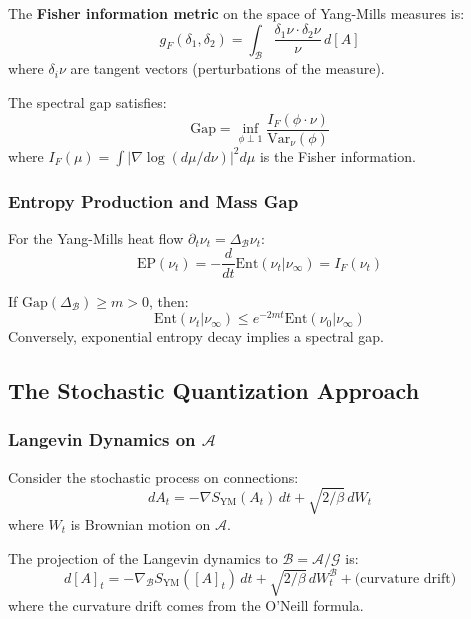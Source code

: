\begin{definition}
The \textbf{Fisher information metric} on the space of Yang-Mills measures is:
\[
g_F(\delta_1, \delta_2) = \int_{\mathcal{B}} \frac{\delta_1 \nu \cdot \delta_2 \nu}{\nu} \, d[A]
\]
where $\delta_i \nu$ are tangent vectors (perturbations of the measure).
\end{definition}

\begin{theorem}
The spectral gap satisfies:
\[
\text{Gap} = \inf_{\phi \perp 1} \frac{I_F(\phi \cdot \nu)}{\text{Var}_\nu(\phi)}
\]
where $I_F(\mu) = \int |\nabla \log(d\mu/d\nu)|^2 d\mu$ is the Fisher information.
\end{theorem}

\subsubsection{Entropy Production and Mass Gap}

\begin{definition}
For the Yang-Mills heat flow $\partial_t \nu_t = \Delta_{\mathcal{B}} \nu_t$:
\[
\text{EP}(\nu_t) = -\frac{d}{dt} \text{Ent}(\nu_t | \nu_\infty) = I_F(\nu_t)
\]
\end{definition}

\begin{theorem}\label{thm:entropy-decay}
If $\text{Gap}(\Delta_{\mathcal{B}}) \geq m > 0$, then:
\[
\text{Ent}(\nu_t | \nu_\infty) \leq e^{-2mt} \text{Ent}(\nu_0 | \nu_\infty)
\]
Conversely, exponential entropy decay implies a spectral gap.
\end{theorem}

\subsection{The Stochastic Quantization Approach}

\subsubsection{Langevin Dynamics on $\mathcal{A}$}

Consider the stochastic process on connections:
\[
dA_t = -\nabla S_{\text{YM}}(A_t) \, dt + \sqrt{2/\beta} \, dW_t
\]
where $W_t$ is Brownian motion on $\mathcal{A}$.

\begin{theorem}
The projection of the Langevin dynamics to $\mathcal{B} = \mathcal{A}/\mathcal{G}$ is:
\[
d[A]_t = -\nabla_{\mathcal{B}} S_{\text{YM}}([A]_t) \, dt + \sqrt{2/\beta} \, dW_t^{\mathcal{B}} + \text{(curvature drift)}
\]
where the curvature drift comes from the O'Neill formula.
\end{theorem}

